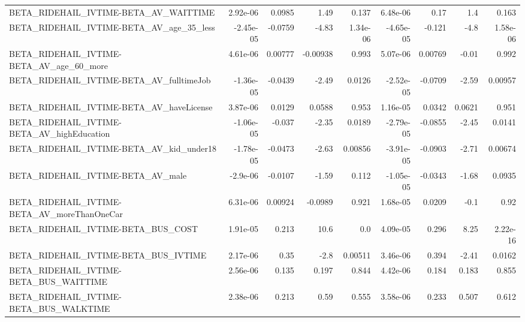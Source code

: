 \begin{tabular}{lrrrrrrrr}
BETA\_RIDEHAIL\_IVTIME-BETA\_AV\_WAITTIME              &    2.92e-06 &       0.0985 &     1.49 &    0.137 &   6.48e-06 &        0.17 &          1.4 &         0.163 \\
BETA\_RIDEHAIL\_IVTIME-BETA\_AV\_age\_35\_less           &   -2.45e-05 &      -0.0759 &    -4.83 & 1.34e-06 &  -4.65e-05 &      -0.121 &         -4.8 &      1.58e-06 \\
BETA\_RIDEHAIL\_IVTIME-BETA\_AV\_age\_60\_more           &    4.61e-06 &      0.00777 & -0.00938 &    0.993 &   5.07e-06 &     0.00769 &        -0.01 &         0.992 \\
BETA\_RIDEHAIL\_IVTIME-BETA\_AV\_fulltimeJob           &   -1.36e-05 &      -0.0439 &    -2.49 &   0.0126 &  -2.52e-05 &     -0.0709 &        -2.59 &       0.00957 \\
BETA\_RIDEHAIL\_IVTIME-BETA\_AV\_haveLicense           &    3.87e-06 &       0.0129 &   0.0588 &    0.953 &   1.16e-05 &      0.0342 &       0.0621 &         0.951 \\
BETA\_RIDEHAIL\_IVTIME-BETA\_AV\_highEducation         &   -1.06e-05 &       -0.037 &    -2.35 &   0.0189 &  -2.79e-05 &     -0.0855 &        -2.45 &        0.0141 \\
BETA\_RIDEHAIL\_IVTIME-BETA\_AV\_kid\_under18           &   -1.78e-05 &      -0.0473 &    -2.63 &  0.00856 &  -3.91e-05 &     -0.0903 &        -2.71 &       0.00674 \\
BETA\_RIDEHAIL\_IVTIME-BETA\_AV\_male                  &    -2.9e-06 &      -0.0107 &    -1.59 &    0.112 &  -1.05e-05 &     -0.0343 &        -1.68 &        0.0935 \\
BETA\_RIDEHAIL\_IVTIME-BETA\_AV\_moreThanOneCar        &    6.31e-06 &      0.00924 &  -0.0989 &    0.921 &   1.68e-05 &      0.0209 &         -0.1 &          0.92 \\
BETA\_RIDEHAIL\_IVTIME-BETA\_BUS\_COST                 &    1.91e-05 &        0.213 &     10.6 &      0.0 &   4.09e-05 &       0.296 &         8.25 &      2.22e-16 \\
BETA\_RIDEHAIL\_IVTIME-BETA\_BUS\_IVTIME               &    2.17e-06 &         0.35 &     -2.8 &  0.00511 &   3.46e-06 &       0.394 &        -2.41 &        0.0162 \\
BETA\_RIDEHAIL\_IVTIME-BETA\_BUS\_WAITTIME             &    2.56e-06 &        0.135 &    0.197 &    0.844 &   4.42e-06 &       0.184 &        0.183 &         0.855 \\
BETA\_RIDEHAIL\_IVTIME-BETA\_BUS\_WALKTIME             &    2.38e-06 &        0.213 &     0.59 &    0.555 &   3.58e-06 &       0.233 &        0.507 &         0.612 \\

\end{tabular}
